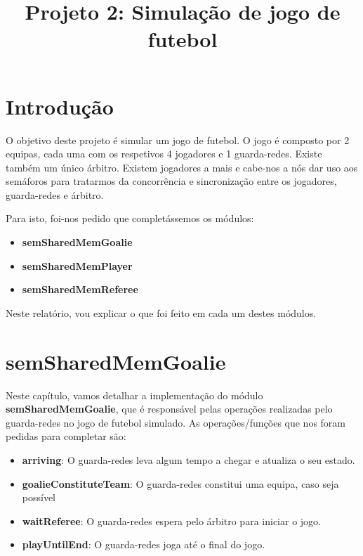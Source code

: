 \documentclass[code,math]{relatorio-deti}
\title{Projeto 2: Simulação de jogo de futebol}
\begin{document}
\maketitle

\tableofcontents
\clearpage


\setcounter{page}{1}

\chapter{Introdução}

O objetivo deste projeto é simular um jogo de futebol. O jogo é composto por 2 equipas, cada uma com os respetivos 4 jogadores e 1 guarda-redes. Existe também um único árbitro.
Existem jogadores a mais e cabe-nos a nós dar uso aos semáforos para tratarmos da concorrência e sincronização entre os jogadores, guarda-redes e árbitro.

Para isto, foi-nos pedido que completássemos os módulos:

\begin{itemize}
    \item \textbf{semSharedMemGoalie}
    \item \textbf{semSharedMemPlayer}
    \item \textbf{semSharedMemReferee}
\end{itemize}

Neste relatório, vou explicar o que foi feito em cada um destes módulos.

\chapter{semSharedMemGoalie}

Neste capítulo, vamos detalhar a implementação do módulo \textbf{semSharedMemGoalie}, que é responsável pelas operações realizadas pelo guarda-redes no jogo de futebol simulado. As operações/funções que nos foram pedidas para completar são:

\begin{itemize}
    \item \textbf{arriving}: O guarda-redes leva algum tempo a chegar e atualiza o seu estado.
    \item \textbf{goalieConstituteTeam}: O guarda-redes constitui uma equipa, caso seja possível
    \item \textbf{waitReferee}: O guarda-redes espera pelo árbitro para iniciar o jogo.
    \item \textbf{playUntilEnd}: O guarda-redes joga até o final do jogo.
\end{itemize}
\end{document}
